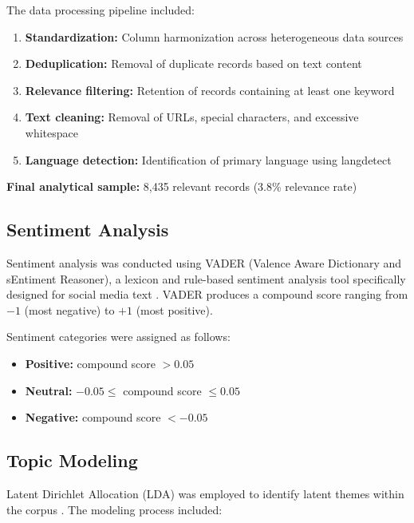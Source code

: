 \documentclass[11pt,a4paper]{article}
\begin{document}
The data processing pipeline included:

\begin{enumerate}[leftmargin=*, itemsep=0.3em]
    \item \textbf{Standardization:} Column harmonization across heterogeneous data sources
    \item \textbf{Deduplication:} Removal of duplicate records based on text content
    \item \textbf{Relevance filtering:} Retention of records containing at least one keyword
    \item \textbf{Text cleaning:} Removal of URLs, special characters, and excessive whitespace
    \item \textbf{Language detection:} Identification of primary language using langdetect
\end{enumerate}

\textbf{Final analytical sample:} 8,435 relevant records (3.8\% relevance rate)

\subsection{Sentiment Analysis}

Sentiment analysis was conducted using VADER (Valence Aware Dictionary and sEntiment Reasoner), a lexicon and rule-based sentiment analysis tool specifically designed for social media text \citep{hutto2014vader}. VADER produces a compound score ranging from $-1$ (most negative) to $+1$ (most positive).

Sentiment categories were assigned as follows:
\begin{itemize}[leftmargin=*, itemsep=0.2em]
    \item \textbf{Positive:} compound score $> 0.05$
    \item \textbf{Neutral:} $-0.05 \leq$ compound score $\leq 0.05$
    \item \textbf{Negative:} compound score $< -0.05$
\end{itemize}

\subsection{Topic Modeling}

Latent Dirichlet Allocation (LDA) was employed to identify latent themes within the corpus \citep{blei2003latent}. The modeling process included:
\end{document}
